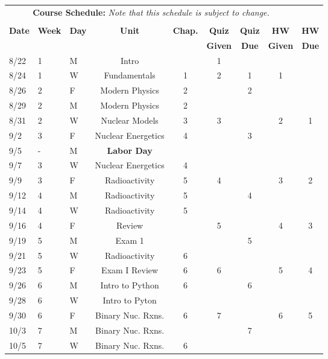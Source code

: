 \documentclass[11pt, a4paper]{article}
\begin{document}
\pagebreak
\FloatBarrier
\renewcommand{\arraystretch}{1}
\begin{table}[h]
\begin{center}
\begin{tabular}{lllcccccc}
\multicolumn{8}{c}{\textbf{Course Schedule:}\textit{ Note that this schedule is
subject to change.}}\\
&&&&&&&&\\
\textbf{Date} & \textbf{Week} & \textbf{Day} & \textbf{Unit} & \textbf{Chap.} & \textbf{Quiz}& \textbf{Quiz} & \textbf{HW} & \textbf{HW}\\
              &  &  &  &  & \textbf{Given} & \textbf{Due} & \textbf{Given} & \textbf{Due}\\ \hline
\hline
8/22 & 1 & M & Intro              &  & 1 &  &  & \\
8/24 & 1 & W & Fundamentals       & 1 & 2 & 1 & 1 &  \\
8/26 & 2 & F & Modern Physics     & 2 &   & 2 & &  \\
8/29 & 2 & M & Modern Physics     & 2 &   &  &  &  \\
8/31 & 2 & W & Nuclear Models     & 3 & 3 &  & 2 & 1  \\
9/2 & 3 & F & Nuclear Energetics & 4 &   & 3 & &  \\
9/5 & - & M & \textbf{Labor Day}  &  & &  & &  \\
9/7 & 3 & W & Nuclear Energetics  & 4 &   &  &  &  \\
9/9 & 3 & F & Radioactivity       & 5 & 4 &  & 3 & 2 \\
9/12 & 4 & M & Radioactivity       & 5 &   & 4 &  &  \\
9/14 & 4 & W & Radioactivity       & 5 &   &  &  &  \\
9/16 & 4 & F & Review             &   & 5 &  & 4 & 3 \\
9/19 & 5 & M & Exam 1             &   &   & 5  &  &  \\
9/21 & 5 & W & Radioactivity  & 6 &   &  &  &  \\
9/23 & 5 & F & Exam I Review  & 6 & 6 &  & 5 & 4 \\
9/26 & 6 & M & Intro to Python  & 6 &   & 6 &  &  \\
9/28 & 6 & W & Intro to Pyton      &  &  &  &  &  \\
9/30 & 6 & F & Binary Nuc. Rxns.  & 6 & 7 &  & 6 & 5  \\
10/3 & 7 & M & Binary Nuc. Rxns. &  &  & 7 &  &  \\
10/5 & 7 & W & Binary Nuc. Rxns.  & 6 &  &  &  &  \\

\end{tabular}
\end{center}
\end{table}
\end{document}
